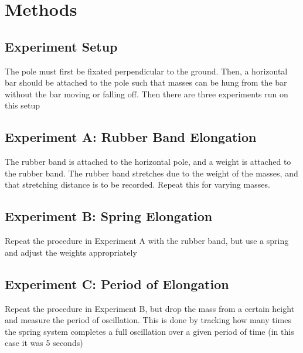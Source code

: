 \documentclass[12pt]{article}
\begin{document}
    \section{Methods}
        \subsection{Experiment Setup}
            The pole must first be fixated perpendicular to the ground.
            Then, a horizontal bar should be attached to the pole such that
            masses can be hung from the bar without the bar moving or falling
            off. Then there are three experiments run on this setup
        \subsection{Experiment A: Rubber Band Elongation}
            The rubber band is attached to the horizontal pole, and a weight
            is attached to the rubber band. The rubber band stretches due to
            the weight of the masses, and that stretching distance is to be
            recorded. Repeat this for varying masses.
        \subsection{Experiment B: Spring Elongation}
            Repeat the procedure in Experiment A with the rubber band, but use
            a spring and adjust the weights appropriately
        \subsection{Experiment C: Period of Elongation}
            Repeat the procedure in Experiment B, but drop the mass from a
            certain height and measure the period of oscillation. This is done
            by tracking how many times the spring system completes a full 
            oscillation over a given period of time (in this case it was 5
            seconds)
\end{document}
